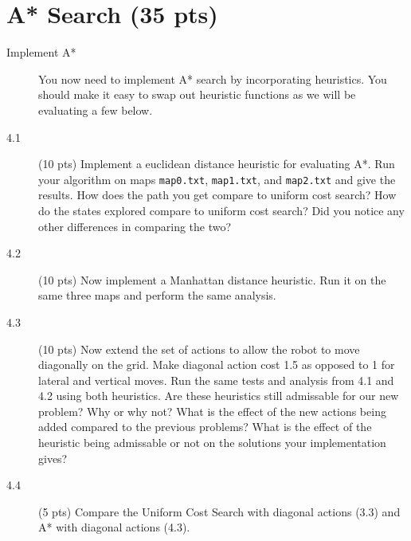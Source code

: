 \documentclass[11pt]{hermans-hw}
\begin{document}
\section{A* Search (35 pts)}
\begin{description}
\item[Implement A*] You now need to implement A* search by incorporating heuristics. You should make it easy to swap out heuristic functions as we will be evaluating a few below.

\item[4.1] (10 pts) Implement a euclidean distance heuristic for evaluating A*. Run your algorithm on maps \texttt{map0.txt}, \texttt{map1.txt}, and \texttt{map2.txt} and give the results. How does the path you get compare to uniform cost search? How do the states explored compare to uniform cost search? Did you notice any other differences in comparing the two?

\item[4.2] (10 pts) Now implement a Manhattan distance heuristic. Run it on the same three maps and perform the same analysis.

\item[4.3] (10 pts) Now extend the set of actions to allow the robot to move diagonally on the grid. Make diagonal action cost 1.5 as opposed to 1 for lateral and vertical moves. Run the same tests and analysis from 4.1 and 4.2 using both heuristics. Are these heuristics still admissable for our new problem? Why or why not? What is the effect of the new actions being added compared to the previous problems? What is the effect of the heuristic being admissable or not on the solutions your implementation gives? 

\item[4.4] (5 pts) Compare the Uniform Cost Search with diagonal actions (3.3) and A* with diagonal actions (4.3). 


\end{description}
\end{document}
